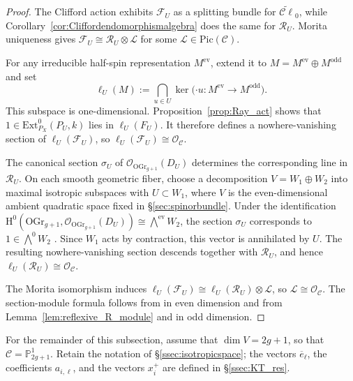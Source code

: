 \documentclass[12pt, letterpaper]{amsart}
\theoremstyle{definition}
\newcommand{\PP}{\mathbb{P} }
\newcommand{\cC}{\mathcal{C} }
\newcommand{\cF}{\mathcal{F} }
\newcommand{\cL}{\mathcal{L} }
\newcommand{\cO}{\mathcal{O} }
\newcommand{\cR}{\mathcal{R} }
\newcommand{\rH}{\mathrm{H} }
\def\OGr{\mathrm{OGr}}
\def\Ext{\mathrm{Ext} }
\def\Pic{\mathrm{Pic} }
\begin{document}
\begin{proof}
The Clifford action exhibits \(\cF_U\) as a splitting bundle for \(\widetilde{\cC\ell}_0\), while Corollary~\ref{cor:Cliffordendomorphismalgebra} does the same for \(\cR_U\). Morita uniqueness gives \(\cF_U\cong\cR_U\otimes\cL\) for some \(\cL\in\Pic(\cC)\).

For any irreducible half-spin representation \(M^{\mathrm{ev}}\), extend it to \(M=M^{\mathrm{ev}}\oplus M^{\mathrm{odd}}\) and set
\[\ell_U(M):=\bigcap_{u\in U}\ker\bigl(\mathord{\cdot}u:M^{\mathrm{ev}}\longrightarrow M^{\mathrm{odd}}\bigr).\]
This subspace is one-dimensional. Proposition~\ref{prop:Ray_act} shows that \(1\in\Ext_{P_X}^0(P_U,k)\) lies in \(\ell_U(F_U)\). It therefore defines a nowhere-vanishing section of \(\ell_U(\cF_U)\), so \(\ell_U(\cF_U)\cong\cO_{\cC}\).

The canonical section \(\sigma_U\) of \(\cO_{\OGr_{g+1}}(D_U)\) determines the corresponding line in \(\cR_U\). On each smooth geometric fiber, choose a decomposition \(V=W_1\oplus W_2\) into maximal isotropic subspaces with \(U\subset W_1\), where \(V\) is the even-dimensional ambient quadratic space fixed in \S\ref{sec:spinorbundle}. Under the identification \(\rH^0(\OGr_{g+1},\cO_{\OGr_{g+1}}(D_U))\cong\bigwedge^{\mathrm{ev}}W_2\), the section \(\sigma_U\) corresponds to \(1\in\bigwedge^0W_2\) \cite[\S1]{Muk95}. Since \(W_1\) acts by contraction, this vector is annihilated by \(U\). The resulting nowhere-vanishing section descends together with \(\cR_U\), and hence \(\ell_U(\cR_U)\cong\cO_{\cC}\).

The Morita isomorphism induces \(\ell_U(\cF_U)\cong\ell_U(\cR_U)\otimes\cL\), so \(\cL\cong\cO_{\cC}\). The section-module formula follows from \cite[Proposition~4.5]{ES25} in even dimension and from Lemma~\ref{lem:reflexive_R_module} and \cite[Lemma~3.2]{HO20} in odd dimension.
\end{proof}

For the remainder of this subsection, assume that \(\dim V=2g+1\), so that \(\cC=\PP_{2g+1}^1\). Retain the notation of \S\ref{ssec:isotropicspace}; the vectors \(\overline e_\ell\), the coefficients \(a_{i,\ell}\), and the vectors \(x_i^+\) are defined in \S\ref{ssec:KT_res}.
\end{document}
